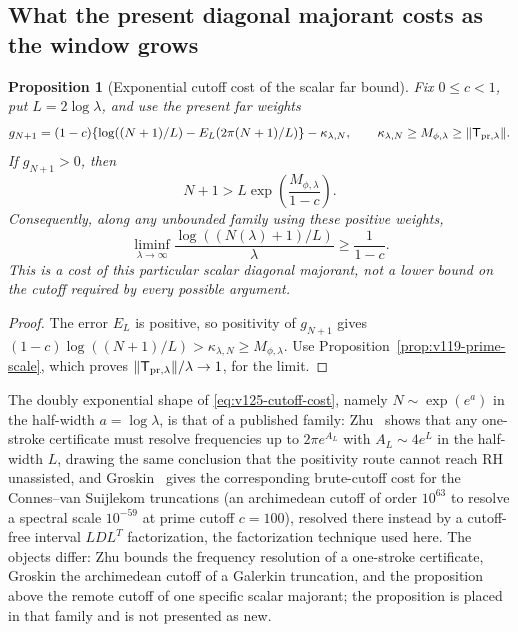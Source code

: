 \documentclass[11pt]{article}
\newtheorem{proposition}[theorem]{Proposition}
\theoremstyle{remark}
\begin{document}
\subsection*{What the present diagonal majorant costs as the window grows}

\begin{proposition}[Exponential cutoff cost of the scalar far bound]
\label{prop:v125-cutoff-cost}
Fix $0\le c<1$, put $L=2\log\lambda$, and use the present far
weights
\[
 g_{N+1}=(1-c)\{\log((N+1)/L)-E_L(2\pi(N+1)/L)\}
               -\kappa_{\lambda,N},
 \qquad \kappa_{\lambda,N}\ge M_{\phi,\lambda}
                    \ge\|\mathsf T_{{\rm pr},\lambda}\|.
\]
If $g_{N+1}>0$, then
\begin{equation}\label{eq:v125-cutoff-cost}
 N+1>L\exp\!\left(\frac{M_{\phi,\lambda}}{1-c}\right).
\end{equation}
Consequently, along any unbounded family using these positive weights,
\[
 \liminf_{\lambda\to\infty}
 \frac{\log((N(\lambda)+1)/L)}{\lambda}\ge\frac1{1-c}.
\]
This is a cost of this particular scalar diagonal majorant, not a
lower bound on the cutoff required by every possible argument.
\end{proposition}
\begin{proof}
The error $E_L$ is positive, so positivity of $g_{N+1}$ gives
$(1-c)\log((N+1)/L)>\kappa_{\lambda,N}\ge M_{\phi,\lambda}$.
Use Proposition~\ref{prop:v119-prime-scale}, which proves
$\|\mathsf T_{{\rm pr},\lambda}\|/\lambda\to1$, for the limit.
\end{proof}

The doubly exponential shape of \eqref{eq:v125-cutoff-cost}, namely
$N\sim\exp(e^{a})$ in the half-width $a=\log\lambda$, is that of a
published family: Zhu~\cite{Zhu2026} shows that any one-stroke
certificate must resolve frequencies up to $2\pi e^{A_L}$ with
$A_L\sim4e^{L}$ in the half-width $L$, drawing the same conclusion that
the positivity route cannot reach RH unassisted, and
Groskin~\cite{Groskin2026} gives the corresponding brute-cutoff cost
for the Connes--van Suijlekom truncations (an archimedean cutoff of
order $10^{63}$ to resolve a spectral scale $10^{-59}$ at prime cutoff
$c=100$), resolved there instead by a cutoff-free interval $LDL^{T}$
factorization, the factorization technique used here.
The objects differ: Zhu bounds the frequency resolution of a
one-stroke certificate, Groskin the archimedean cutoff of a Galerkin
truncation, and the proposition above the remote cutoff of one specific
scalar majorant; the proposition is placed in that family and is not
presented as new.
\end{document}
